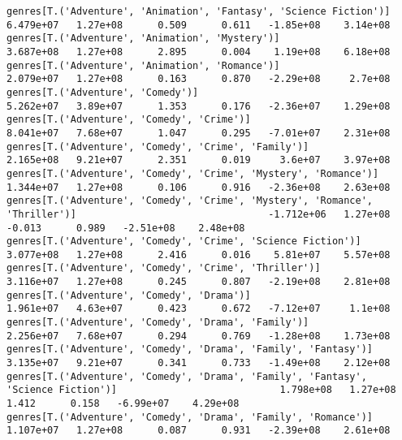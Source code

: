 \documentclass[11pt]{article}
\begin{document}
\begin{Verbatim}[commandchars=\\\{\}]
genres[T.('Adventure', 'Animation', 'Fantasy', 'Science Fiction')]                                            6.479e+07   1.27e+08      0.509      0.611   -1.85e+08    3.14e+08
genres[T.('Adventure', 'Animation', 'Mystery')]                                                               3.687e+08   1.27e+08      2.895      0.004    1.19e+08    6.18e+08
genres[T.('Adventure', 'Animation', 'Romance')]                                                               2.079e+07   1.27e+08      0.163      0.870   -2.29e+08     2.7e+08
genres[T.('Adventure', 'Comedy')]                                                                             5.262e+07   3.89e+07      1.353      0.176   -2.36e+07    1.29e+08
genres[T.('Adventure', 'Comedy', 'Crime')]                                                                    8.041e+07   7.68e+07      1.047      0.295   -7.01e+07    2.31e+08
genres[T.('Adventure', 'Comedy', 'Crime', 'Family')]                                                          2.165e+08   9.21e+07      2.351      0.019     3.6e+07    3.97e+08
genres[T.('Adventure', 'Comedy', 'Crime', 'Mystery', 'Romance')]                                              1.344e+07   1.27e+08      0.106      0.916   -2.36e+08    2.63e+08
genres[T.('Adventure', 'Comedy', 'Crime', 'Mystery', 'Romance', 'Thriller')]                                 -1.712e+06   1.27e+08     -0.013      0.989   -2.51e+08    2.48e+08
genres[T.('Adventure', 'Comedy', 'Crime', 'Science Fiction')]                                                 3.077e+08   1.27e+08      2.416      0.016    5.81e+07    5.57e+08
genres[T.('Adventure', 'Comedy', 'Crime', 'Thriller')]                                                        3.116e+07   1.27e+08      0.245      0.807   -2.19e+08    2.81e+08
genres[T.('Adventure', 'Comedy', 'Drama')]                                                                    1.961e+07   4.63e+07      0.423      0.672   -7.12e+07     1.1e+08
genres[T.('Adventure', 'Comedy', 'Drama', 'Family')]                                                          2.256e+07   7.68e+07      0.294      0.769   -1.28e+08    1.73e+08
genres[T.('Adventure', 'Comedy', 'Drama', 'Family', 'Fantasy')]                                               3.135e+07   9.21e+07      0.341      0.733   -1.49e+08    2.12e+08
genres[T.('Adventure', 'Comedy', 'Drama', 'Family', 'Fantasy', 'Science Fiction')]                            1.798e+08   1.27e+08      1.412      0.158   -6.99e+07    4.29e+08
genres[T.('Adventure', 'Comedy', 'Drama', 'Family', 'Romance')]                                               1.107e+07   1.27e+08      0.087      0.931   -2.39e+08    2.61e+08

\end{Verbatim}
\end{document}

